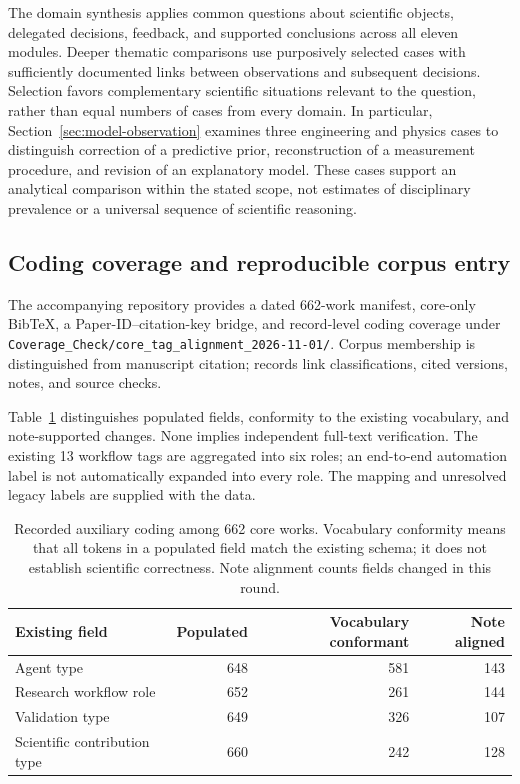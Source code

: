The domain synthesis applies common questions about scientific objects, delegated decisions, feedback, and supported conclusions across all eleven modules. Deeper thematic comparisons use purposively selected cases with sufficiently documented links between observations and subsequent decisions. Selection favors complementary scientific situations relevant to the question, rather than equal numbers of cases from every domain. In particular, Section~\ref{sec:model-observation} examines three engineering and physics cases to distinguish correction of a predictive prior, reconstruction of a measurement procedure, and revision of an explanatory model. These cases support an analytical comparison within the stated scope, not estimates of disciplinary prevalence or a universal sequence of scientific reasoning.

\subsection{Coding coverage and reproducible corpus entry}

The accompanying repository provides a dated 662-work manifest, core-only BibTeX, a Paper-ID--citation-key bridge, and record-level coding coverage under \nolinkurl{Coverage_Check/core_tag_alignment_2026-11-01/}. Corpus membership is distinguished from manuscript citation; records link classifications, cited versions, notes, and source checks.

Table~\ref{tab:coding-coverage} distinguishes populated fields, conformity to the existing vocabulary, and note-supported changes. None implies independent full-text verification. The existing 13 workflow tags are aggregated into six roles; an end-to-end automation label is not automatically expanded into every role. The mapping and unresolved legacy labels are supplied with the data.

\begin{table}[H]
\caption{Recorded auxiliary coding among 662 core works. Vocabulary conformity means that all tokens in a populated field match the existing schema; it does not establish scientific correctness. Note alignment counts fields changed in this round.}
\label{tab:coding-coverage}
\small
\begin{tabularx}{\textwidth}{@{}Xrrr@{}}
\toprule
Existing field & Populated & Vocabulary conformant & Note aligned \\
\midrule
Agent type & 648 & 581 & 143 \\
Research workflow role & 652 & 261 & 144 \\
Validation type & 649 & 326 & 107 \\
Scientific contribution type & 660 & 242 & 128 \\
\bottomrule
\end{tabularx}
\end{table}

